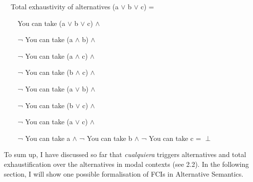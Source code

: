 \begin{styleStandard}
\label{bkm:Ref533761693}\ \ Total exhaustivity of alternatives (a ${\vee}$ b ${\vee}$ c) =
\end{styleStandard}

\begin{styleStandard}
\ \ \ \ You can take (a ${\vee}$ b ${\vee}$ c) ${\wedge}$
\end{styleStandard}

\begin{styleStandard}
\ \ \ \ ¬ You can take (a ${\wedge}$ b) ${\wedge}$
\end{styleStandard}

\begin{styleStandard}
\ \ \ \ ¬ You can take (a ${\wedge}$ c) ${\wedge}$
\end{styleStandard}

\begin{styleStandard}
\ \ \ \ ¬ You can take (b ${\wedge}$ c) ${\wedge}$
\end{styleStandard}

\begin{styleStandard}
\ \ \ \ ¬ You can take (a ${\vee}$ b) ${\wedge}$
\end{styleStandard}

\begin{styleStandard}
\ \ \ \ ¬ You can take (b ${\vee}$ c) ${\wedge}$
\end{styleStandard}

\begin{styleStandard}
\ \ \ \ ¬ You can take (a ${\vee}$ c) ${\wedge}$
\end{styleStandard}

\begin{styleStandard}
\ \ \ \ ¬ You can take a ${\wedge}$ ¬ You can take b ${\wedge}$ ¬ You can take c = ${\perp}$
\end{styleStandard}

\begin{styleStandard}
To sum up, I have discussed so far that \textit{cualquiera} triggers alternatives and total exhaustification over the alternatives in modal contexts (see 2.2). In the following section, I will show one possible formalisation of FCIs in Alternative Semantics.
\end{styleStandard}

